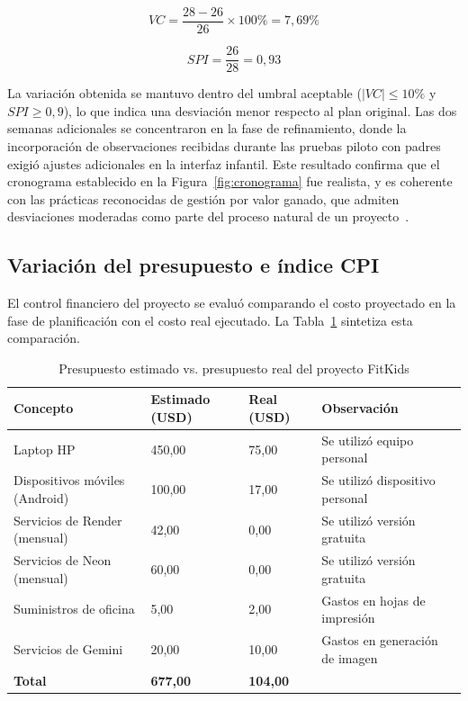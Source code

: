				\begin{equation}
					VC = \frac{28 - 26}{26} \times 100\% = 7{,}69\%
				\end{equation}
				
				\begin{equation}
					SPI = \frac{26}{28} = 0{,}93
				\end{equation}
				
				La variación obtenida se mantuvo dentro del umbral aceptable ($|VC| \leq 10\%$ y $SPI \geq 0{,}9$), lo que indica una desviación menor respecto al plan original. Las dos semanas adicionales se concentraron en la fase de refinamiento, donde la incorporación de observaciones recibidas durante las pruebas piloto con padres exigió ajustes adicionales en la interfaz infantil. Este resultado confirma que el cronograma establecido en la Figura~\ref{fig:cronograma} fue realista, y es coherente con las prácticas reconocidas de gestión por valor ganado, que admiten desviaciones moderadas como parte del proceso natural de un proyecto~\cite{GuerreroUlloa2024,Creswell2018}.
				
			\subsection{Variación del presupuesto e índice CPI}
			\label{subsec:vp}
				El control financiero del proyecto se evaluó comparando el costo proyectado en la fase de planificación con el costo real ejecutado. La Tabla~\ref{tab:presupuesto_real} sintetiza esta comparación.
				
				\begin{table}[H]
					\centering\small
					\caption{Presupuesto estimado vs. presupuesto real del proyecto FitKids}
					\label{tab:presupuesto_real}
					\begin{tabular}{p{4.2cm}p{2.7cm}p{2.7cm}p{3.5cm}}
						\hline
						\textbf{Concepto} & \textbf{Estimado (USD)} & \textbf{Real (USD)} & \textbf{Observación}\\
						\hline
						Laptop HP                         & 450{,}00 & 75{,}00  & Se utilizó equipo personal      \\
						Dispositivos móviles (Android)    & 100{,}00 & 17{,}00  & Se utilizó dispositivo personal \\
						Servicios de Render (mensual)     & 42{,}00  & 0{,}00   & Se utilizó versión gratuita     \\
						Servicios de Neon (mensual)       & 60{,}00  & 0{,}00   & Se utilizó versión gratuita     \\
						Suministros de oficina            & 5{,}00   & 2{,}00   & Gastos en hojas de impresión    \\
						Servicios de Gemini               & 20{,}00  & 10{,}00  & Gastos en generación de imagen  \\
						\textbf{Total}  & \textbf{677{,}00} & \textbf{104{,}00} & \\
						\hline
					\end{tabular}
				\end{table}
				\tblnote
				
